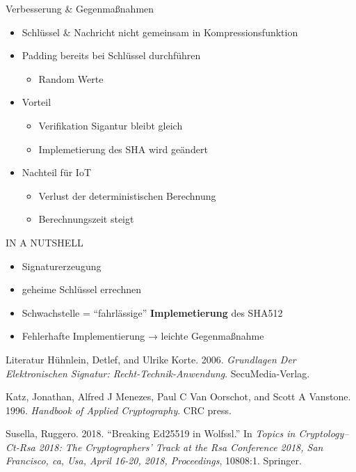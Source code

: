 \documentclass[
  10pt,
  ignorenonframetext,
  aspectratio=43,
]{beamer}
\providecommand{\tightlist}{%
  \setlength{\itemsep}{0pt}\setlength{\parskip}{0pt}}
\newlength{\cslhangindent}
\newenvironment{cslreferences}%
  {\setlength{\parindent}{0pt}%
  \everypar{\setlength{\hangindent}{\cslhangindent}}\ignorespaces}%
  {\par}
\begin{document}
\begin{frame}{Verbesserung \& Gegenmaßnahmen}
\protect\hypertarget{verbesserung-gegenmauxdfnahmen}{}
\begin{itemize}
\item
  Schlüssel \& Nachricht nicht gemeinsam in Kompressionsfunktion
\item
  Padding bereits bei Schlüssel durchführen

  \begin{itemize}
  \tightlist
  \item
    Random Werte
  \end{itemize}
\item
  Vorteil

  \begin{itemize}
  \tightlist
  \item
    Verifikation Sigantur bleibt gleich
  \item
    Implemetierung des SHA wird geändert
  \end{itemize}
\item
  Nachteil für IoT

  \begin{itemize}
  \tightlist
  \item
    Verlust der deterministischen Berechnung
  \item
    Berechnungszeit steigt
  \end{itemize}
\end{itemize}
\end{frame}

\begin{frame}{IN A NUTSHELL}
\protect\hypertarget{in-a-nutshell}{}
\begin{itemize}
\item
  Signaturerzeugung
\item
  geheime Schlüssel errechnen
\item
  Schwachstelle = ``fahrlässige'' \textbf{Implemetierung} des SHA512
\item
  Fehlerhafte Implementierung → leichte Gegenmaßnahme
\end{itemize}
\end{frame}

\begin{frame}{Literatur}
\protect\hypertarget{literatur}{}
\hypertarget{refs}{}
\begin{cslreferences}
\leavevmode\hypertarget{ref-huhnlein2006grundlagen}{}%
Hühnlein, Detlef, and Ulrike Korte. 2006. \emph{Grundlagen Der
Elektronischen Signatur: Recht-Technik-Anwendung}. SecuMedia-Verlag.

\leavevmode\hypertarget{ref-katz1996handbook}{}%
Katz, Jonathan, Alfred J Menezes, Paul C Van Oorschot, and Scott A
Vanstone. 1996. \emph{Handbook of Applied Cryptography}. CRC press.

\leavevmode\hypertarget{ref-susella2018breaking}{}%
Susella, Ruggero. 2018. ``Breaking Ed25519 in Wolfssl.'' In \emph{Topics
in Cryptology--Ct-Rsa 2018: The Cryptographers' Track at the Rsa
Conference 2018, San Francisco, ca, Usa, April 16-20, 2018,
Proceedings}, 10808:1. Springer.
\end{cslreferences}
\end{frame}
\end{document}
